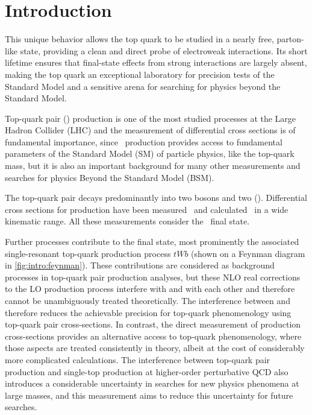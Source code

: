 \chapter{Introduction}%
\label{ch:intro}


This unique behavior allows the top quark to be studied in a nearly free, parton-like state, providing a clean and direct probe of electroweak interactions. Its short lifetime ensures that final-state effects from strong interactions are largely absent, making the top quark an exceptional laboratory for precision tests of the Standard Model and a sensitive arena for searching for physics beyond the Standard Model.



Top-quark pair (\ttbar) production is one of the most studied processes
at the Large Hadron Collider (LHC) and the measurement of differential cross
sections is of fundamental importance, since \ttbar\ production provides access
to fundamental parameters of the Standard Model (SM) of particle physics,
like the top-quark mass, but it is also an important background for many
other measurements and searches for physics Beyond the Standard Model (BSM).

The top-quark pair decays predominantly into two \Wboson bosons and two \bquarks (\WbWb).
Differential cross sections for \ttbar production have been
measured~\cite{TOPQ-2016-01,TOPQ-2018-15,CMS-TOP-16-007,CMS-TOP-16-014,CMS-TOP-17-002}
and calculated~\cite{Czakon:2011xx,Czakon:2015owf,Czakon:2016dgf} in a wide
kinematic range.
All these measurements consider the \WbWb\ final state.

Further processes contribute to the \WbWb final state, most prominently
the associated single-resonant top-quark production process \( tWb \)
(shown on a Feynman diagram in \cref{fig:intro:feynman}).
These contributions are considered as background
processes in top-quark pair production analyses, but these NLO real corrections
to the LO \tW production process interfere with \ttbar and with each other
and therefore cannot be unambiguously treated theoretically.
The interference between \ttbar and \tW therefore reduces the achievable precision for top-quark phenomenology
using top-quark pair cross-sections. In contrast, the direct measurement
of \WbWb production cross-sections provides an alternative access to top-quark
phenomenology, where those aspects are treated consistently in theory,
albeit at the cost of considerably more complicated calculations.
The interference between top-quark pair production and single-top production
at higher-order perturbative QCD also introduces a considerable uncertainty
in searches for new physics phenomena at large masses, and this
measurement aims to reduce this uncertainty for future searches.

